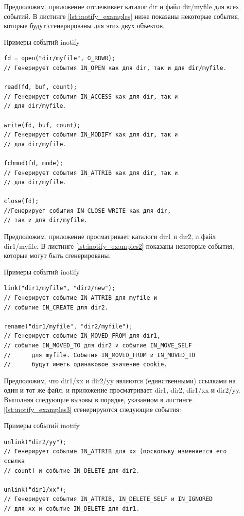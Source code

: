 \documentclass[14pt, russian]{scrartcl}
\begin{document}
Предположим, приложение отслеживает каталог dir и файл dir/myfile для всех
событий. В листинге \ref{lst:inotify_examples} ниже показаны некоторые события, которые будут сгенерированы
для этих двух объектов.

\begin{listing}
\caption{Примеры событий inotify}
\label{lst:inotify_examples}
\begin{verbatim}
fd = open("dir/myfile", O_RDWR);
// Генерирует события IN_OPEN как для dir, так и для dir/myfile.

read(fd, buf, count);
// Генерирует события IN_ACCESS как для dir, так и
// для dir/myfile.

write(fd, buf, count);
// Генерирует события IN_MODIFY как для dir, так и
// для dir/myfile.

fchmod(fd, mode);
// Генерирует события IN_ATTRIB как для dir, так и
// для dir/myfile.

close(fd);
//Генерирует события IN_CLOSE_WRITE как для dir,
// так и для dir/myfile.
\end{verbatim}
\end{listing}


Предположим, приложение просматривает каталоги dir1 и dir2,
и файл dir1/myfile. В листинге \ref{lst:inotify_examples2} показаны некоторые
события, которые могут быть сгенерированы.

\begin{listing}
\caption{Примеры событий inotify}
\label{lst:inotify_examples2}
\begin{verbatim}
link("dir1/myfile", "dir2/new");
// Генерирует событие IN_ATTRIB для myfile и
// событие IN_CREATE для dir2.

rename("dir1/myfile", "dir2/myfile");
// Генерирует событие IN_MOVED_FROM для dir1,
// событие IN_MOVED_TO для dir2 и событие IN_MOVE_SELF
//      для myfile. События IN_MOVED_FROM и IN_MOVED_TO
//      будут иметь одинаковое значение cookie.
\end{verbatim}
\end{listing}

Предположим, что dir1/xx и dir2/yy являются (единственными) ссылками на один и
тот же файл, и приложение просматривает dir1, dir2, dir1/xx и dir2/yy. Выполняя
следующие вызовы в порядке, указанном в листинге \ref{lst:inotify_examples3}
сгенерируются следующие события:

\begin{listing}
\caption{Примеры событий inotify}
\label{lst:inotify_examples3}
\begin{verbatim}
unlink("dir2/yy");
// Генерирует событие IN_ATTRIB для xx (поскольку изменяется его ссылка
// count) и событие IN_DELETE для dir2.

unlink("dir1/xx");
// Генерирует события IN_ATTRIB, IN_DELETE_SELF и IN_IGNORED
// для xx и событие IN_DELETE для dir1.
\end{verbatim}
\end{listing}
\end{document}
